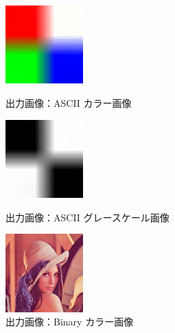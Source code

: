 \documentclass[10pt,a4paper]{jsarticle}
\begin{document}

\begin{figure}[htbp]
  
  \begin{minipage}{0.25\hsize}
    \begin{center}
      
      \includegraphics[width=30mm]{copied_asc_color.jpg}
    \end{center}
    \caption{出力画像：ASCII カラー画像}
    \label{fig:sutehage}
  \end{minipage}
  \begin{minipage}{0.25\hsize}
    \begin{center}
      
      \includegraphics[width=30mm]{copied_asc_gray.jpg}
    \end{center}
    \caption{出力画像：ASCII グレースケール画像}
    \label{fig:sutehage}
  \end{minipage}
  \begin{minipage}{0.25\hsize}
    \begin{center}
      
      \includegraphics[width=30mm]{copied_bina_color.jpg}
    \end{center}
    \caption{出力画像：Binary カラー画像}
    \label{fig:sutehage}
  \end{minipage}
  \begin{minipage}{0.25\hsize}
    \begin{center}
      

\end{center}
\end{minipage}
\end{figure}
\end{document}
